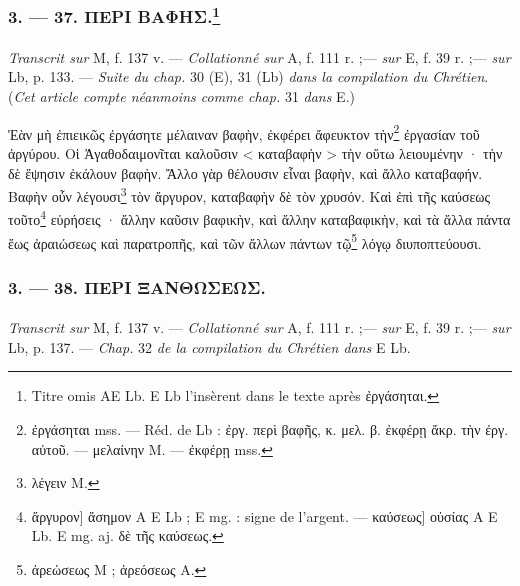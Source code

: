 \documentclass[landscape, a4paper, 11pt, oneside, polutonikogreek, french]{article}
\begin{document}
\bigskip
\centerline{\EightStarTaper}
\centerline{\EightStarTaper\EightStarTaper}
\bigskip

\subsubsection[3. --- 37. ΠΕΡΙ ΒΑΦΗΣ.]{3. --- 37. ΠΕΡΙ ΒΑΦΗΣ.\footnote{Titre omis AE Lb. E Lb l'insèrent dans le texte après ἐργάσηται.}}
\paragraph{}
\emph{Transcrit sur} M, f. 137 v. --- \emph{Collationné sur} A, f. 111 r. ;--- \emph{sur} E, f. 39 r. ;--- \emph{sur} Lb, p. 133. --- \emph{Suite du chap.} 30 (E), 31 (Lb) \emph{dans la compilation du Chrétien}. (\emph{Cet article compte néanmoins comme chap.} 31 \emph{dans} E.)

\bigskip

Ἐὰν μὴ ἐπιεικῶς ἐργάσητε μέλαιναν βαφὴν, ἐκφέρει ἄφευκτον τὴν\footnote{ἐργάσηται mss. --- Réd. de Lb : ἐργ. περὶ βαφῆς, κ. μελ. β. ἐκφέρῃ ἄκρ. τὴν ἐργ. αὐτοῦ. --- μελαίνην M. --- ἐκφέρῃ mss.} ἐργασίαν τοῦ ἀργύρου. Οἱ Ἀγαθοδαιμονῖται καλοῦσιν < καταβαφὴν > τὴν οὕτω λειουμένην · τὴν δὲ ἕψησιν ἐκάλουν βαφὴν. Ἄλλο γὰρ θέλουσιν εἶναι βαφὴν, καὶ ἄλλο καταβαφήν. Βαφὴν οὖν λέγουσι\footnote{λέγειν M.} τὸν ἄργυρον, καταβαφὴν δὲ τὸν χρυσόν. Καὶ ἐπὶ τῆς καύσεως τοῦτο\footnote{ἄργυρον] ἄσημον A E Lb ; E mg. : signe de l'argent. --- καύσεως] οὐσίας A E Lb. E mg. aj. δὲ τῆς καύσεως.} εὑρήσεις · ἄλλην καῦσιν βαφικὴν, καὶ ἄλλην καταβαφικὴν, καὶ τὰ ἄλλα πάντα ἕως ἀραιώσεως καὶ παρατροπῆς, καὶ τῶν ἄλλων πάντων τῷ\footnote{ἀρεώσεως M ; ἀρεόσεως A.} λόγῳ διυποπτεύουσι.

\bigskip
\centerline{\EightStarTaper}
\centerline{\EightStarTaper\EightStarTaper}
\bigskip

\subsubsection{3. --- 38. ΠΕΡΙ ΞΑΝΘΩΣΕΩΣ.}
\paragraph{}
\emph{Transcrit sur} M, f. 137 v. --- \emph{Collationné sur} A, f. 111 r. ;--- \emph{sur} E, f. 39 r. ;--- \emph{sur} Lb, p. 137. --- \emph{Chap.} 32 \emph{de la compilation du Chrétien dans} E Lb.

\bigskip
\end{document}
